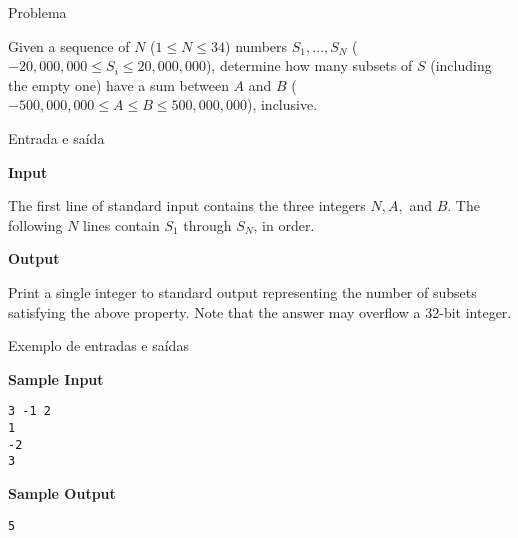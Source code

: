 
\begin{frame}[fragile]{Problema}

Given a sequence of $N$ ($1\leq N\leq 34$) numbers $S_1, \ldots, S_N$ 
($-20,000,000\leq S_i\leq 20,000,000$), determine how many subsets of $S$ (including the empty 
one) have a sum between $A$ and $B$ ($-500,000,000\leq A\leq B\leq 500,000,000$), inclusive.

\end{frame}

\begin{frame}[fragile]{Entrada e saída}

\textbf{Input}

The first line of standard input contains the three integers $N, A,$ and $B$. The following $N$
lines contain $S_1$ through $S_N$, in order.

\vspace{0.2in}

\textbf{Output}

Print a single integer to standard output representing the number of subsets satisfying the above property. Note that the answer may overflow a 32-bit integer.

\end{frame}

\begin{frame}[fragile]{Exemplo de entradas e saídas}

\begin{minipage}[t]{0.45\textwidth}
\textbf{Sample Input}
\begin{verbatim}
3 -1 2
1
-2
3
\end{verbatim}
\end{minipage}
\begin{minipage}[t]{0.5\textwidth}
\textbf{Sample Output}
\begin{verbatim}
5
\end{verbatim}
\end{minipage}
\end{frame}

